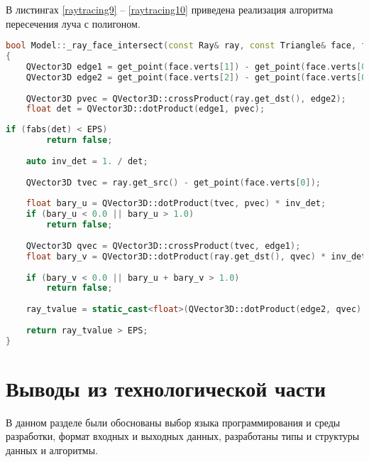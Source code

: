В листингах \ref{raytracing9} -- \ref{raytracing10}   приведена реализация алгоритма пересечения луча с полигоном.
\begin{lstlisting}[label=raytracing9,caption=Реализация алгоритма пересечения луча с полигоном (начало), language=C++]
bool Model::_ray_face_intersect(const Ray& ray, const Triangle& face, float& ray_tvalue) const
{
	QVector3D edge1 = get_point(face.verts[1]) - get_point(face.verts[0]);
	QVector3D edge2 = get_point(face.verts[2]) - get_point(face.verts[0]);
	
	QVector3D pvec = QVector3D::crossProduct(ray.get_dst(), edge2);
	float det = QVector3D::dotProduct(edge1, pvec);
\end{lstlisting}
\clearpage
\begin{lstlisting}[label=raytracing10,caption=Реализация алгоритма пересечения луча с полигоном (конец), language=C++]
	if (fabs(det) < EPS)
		return false;
	
	auto inv_det = 1. / det;
	
	QVector3D tvec = ray.get_src() - get_point(face.verts[0]);
	
	float bary_u = QVector3D::dotProduct(tvec, pvec) * inv_det;
	if (bary_u < 0.0 || bary_u > 1.0)
		return false;
	
	QVector3D qvec = QVector3D::crossProduct(tvec, edge1);
	float bary_v = QVector3D::dotProduct(ray.get_dst(), qvec) * inv_det;
	
	if (bary_v < 0.0 || bary_u + bary_v > 1.0)
		return false;
	
	ray_tvalue = static_cast<float>(QVector3D::dotProduct(edge2, qvec) * inv_det);
	
	return ray_tvalue > EPS;
}
\end{lstlisting}

\section{Выводы из технологической части}

В данном разделе были обоснованы выбор языка программирования и среды разработки, формат входных и выходных данных, разработаны типы и структуры данных и алгоритмы.
